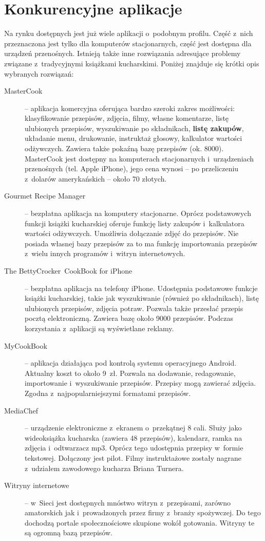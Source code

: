 \documentclass[a4paper,11pt,titlepage,twoside]{mwart}
\begin{document}
\section{Konkurencyjne aplikacje}
Na rynku dostępnych jest już wiele aplikacji o~podobnym profilu. Część z~nich przeznaczona jest tylko dla komputerów stacjonarnych, część jest dostępna dla urządzeń przenośnych. Istnieją także inne rozwiązania adresujące problemy związane z~tradycyjnymi książkami kucharskimi. Poniżej znajduje się krótki opis wybranych rozwiązań:
\begin{description}
  \item[MasterCook] -- aplikacja komercyjna oferująca bardzo szeroki zakres możliwości: klasyfikowanie przepisów, zdjęcia, filmy, własne komentarze, listę ulubionych przepisów, wyszukiwanie po składnikach, \textbf{listę zakupów}, układanie menu, drukowanie, instruktaż głosowy, kalkulator wartości odżywczych. Zawiera także pokaźną bazę przepisów (ok. 8000). Master\nolinebreak[4]Cook jest dostępny na komputerach stacjonarnych i~urządzeniach przenośnych (tel. Apple iPhone), jego cena wynosi -- po przeliczeniu z~dolarów amerykańskich -- około 70 złotych.
  \item[Gourmet Recipe Manager] -- bezpłatna aplikacja na komputery stacjonarne. Oprócz podstawowych funkcji książki kucharskiej oferuje funkcję listy zakupów i~kalkulatora wartości odżywczych. Umożliwia dołączanie zdjęć do przepisów. Nie posiada własnej bazy przepisów za to ma funkcję importowania przepisów z~wielu innych programów i~witryn internetowych.
  \item[The BettyCrocker\textregistered\ CookBook for iPhone] -- bezpłatna aplikacja na telefony iPhone. Udostępnia podstawowe funkcje książki kucharskiej, takie jak wyszukiwanie (również po składnikach), listę ulubionych przepisów, zdjęcia potraw. Pozwala także przesłać przepis pocztą elektroniczną. Zawiera bazę około 9000 przepisów. Podczas korzystania z~aplikacji są wyświetlane reklamy.
\vfill\pagebreak
  \item[MyCookBook] -- aplikacja działająca pod kontrolą systemu operacyjnego Android. Aktualny koszt to około 9~zł. Pozwala na dodawanie, redagowanie, importowanie i~wyszukiwanie przepisów. Przepisy mogą zawierać zdjęcia. Zgodna z~najpopularniejszymi formatami przepisów.
  \item[MediaChef\textregistered] -- urządzenie elektroniczne z~ekranem o~przekątnej 8 cali. Służy jako wideoksiążka kucharska (zawiera 48 przepisów), kalendarz, ramka na zdjęcia i~odtwarzacz mp3. Oprócz tego udostępnia przepisy w~formie tekstowej. Dołączony jest pilot. Filmy instruktażowe zostały nagrane z~udziałem zawodowego kucharza Briana Turnera.
  \item[Witryny internetowe] -- w~Sieci jest dostępnych mnóstwo witryn z~przepisami, zarówno amatorskich jak i~prowadzonych przez firmy z~branży spożywczej. Do tego dochodzą portale społecznościowe skupione wokół gotowania. Witryny te są ogromną bazą przepisów.
\end{description}
\end{document}
